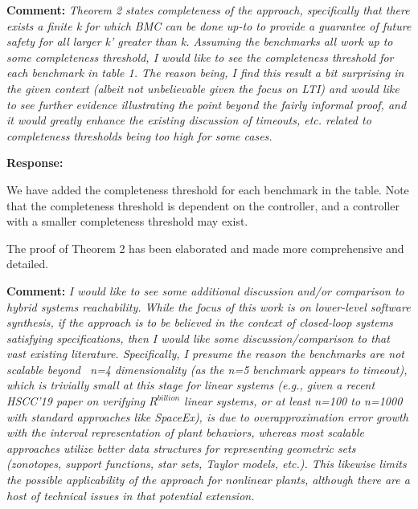 \documentclass{article}
\begin{document}
\vspace{2em}
{\bf Comment: } {\itshape Theorem 2 states completeness of the approach, specifically that there exists a finite k for which BMC can be done up-to to
provide a guarantee of future safety for all larger k' greater than k. Assuming the benchmarks all work up to some completeness threshold, I would
like to see
the completeness threshold for each benchmark in table 1. The reason being, I find this result a bit surprising in the given context (albeit not
unbelievable given the focus on LTI) and would like to see further evidence illustrating the point beyond the fairly informal proof, and it would
greatly enhance the existing discussion of timeouts, etc. related to completeness thresholds being too high for some cases.}

\vspace{1em}

{\bf Response: }

We have added the completeness threshold for each benchmark in the table. Note that the completeness threshold is dependent on the controller, 
and a controller with a smaller completeness threshold may exist. 

The proof of Theorem 2 has been elaborated and made more comprehensive and detailed. 


\vspace{2em}

{\bf Comment: }
{\itshape I would like to see some additional discussion and/or comparison to hybrid systems reachability. While the focus of this work is on
lower-level
software synthesis, if the approach is to be believed in the context of closed-loop systems satisfying specifications, then I would like some
discussion/comparison to that vast existing literature. Specifically, I presume the reason the benchmarks are not scalable beyond ~n=4 dimensionality
(as the n=5 benchmark appears to timeout), which is trivially small at this stage for linear systems (e.g., given a recent HSCC'19 paper on verifying
$R^{billion}$ linear systems, or at least n=100 to n=1000 with standard approaches like SpaceEx), is due to overapproximation error growth with the
interval representation of plant behaviors, whereas most scalable approaches utilize better data structures for representing geometric sets
(zonotopes, support functions, star sets, Taylor models, etc.). This likewise limits the possible applicability of the
approach for nonlinear plants, although there are a host of technical issues in that potential extension. }
\end{document}
